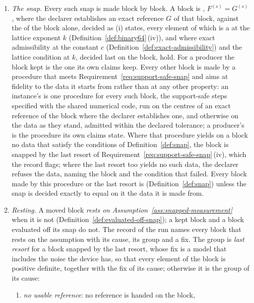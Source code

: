 \begin{requirement}
\begin{enumerate}[label=(\roman*),leftmargin=2.4em]
  used, by the option , it hands only the blocks
  every radius of which is zero.
\item \emph{The snap.} Every such snap is made block by block. A block is
  , $F^{(s)}=G^{(s)}$, where the declarer establishes an exact
  reference $G$ of that block, against the  of the block
  alone, decided as (i) states, every element of which is a
   at the lattice exponent $k$
  (Definition~\ref{def:binary64}\,(iv)), and where exact admissibility at the
  constant $c$ (Definition~\ref{def:exact-admissibility}) and the lattice
  condition at $k$, decided last on the block, hold. For a producer the
  block kept is the one its own claims keep. Every other block is made by a
  procedure that meets Requirement~\ref{req:support-safe-snap} and aims at
  fidelity to the data it starts from rather than at any other property: an
  instance's is one procedure for every such block, the support-safe steps
  specified with the shared numerical code, run on the centres of an exact
  reference of the block where the declarer establishes one, and otherwise
  on the data as they stand, admitted within the declared tolerance; a
  producer's is the procedure its own claims state. Where that procedure
  yields on a block no data that satisfy the conditions of
  Definition~\ref{def:snap}, the block is snapped by the last resort of
  Requirement~\ref{req:support-safe-snap}\,(iv), which the record flags;
  where the last resort too yields no such data, the declarer refuses the
  data, naming the block and the condition that failed. Every block made by
  this procedure or the last resort is 
  (Definition~\ref{def:snap}) unless the snap is decided exactly to equal on
  it the data it is made from.
\item \emph{Resting.} A moved block \emph{rests on
  Assumption~\ref{ass:snapped-measurement}} when it is not  (Definition~\ref{def:evaluated-off-snap}); a kept block and
  a block evaluated off its snap do not. The record of the run names every
  block that rests on the assumption with its cause, its group and a fix.
  The group is \emph{last resort} for a block snapped by the last resort,
  whose fix is a model that includes the noise the device has, so that
  every element of the block is positive definite, together with the fix of
  its cause; otherwise it is the group of its cause:
  \begin{enumerate}[label=(\alph*),leftmargin=2.0em]
  \item \emph{no usable reference}: no reference is handed on the block,

\end{enumerate}
\end{enumerate}
\end{requirement}
